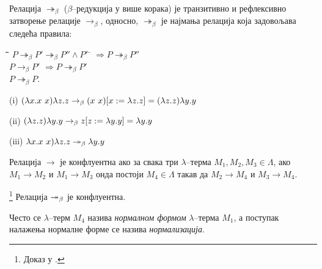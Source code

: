 \begin{definition}
Релација $\twoheadrightarrow_{\beta}$ ($\beta$--редукција у више
корака) је транзитивно и рефлексивно затворење релације
$\rightarrow_{\beta}$, односно, $\twoheadrightarrow_{\beta}$ је
најмања релација која задовољава следећа правила:
\begin{center}
\begin{tabbing}
\hspace{5mm}\=\hspace{5mm}\=\hspace{5mm}\=\hspace{5mm}\=\hspace{5mm}\=\kill
\>\> $P \twoheadrightarrow_{\beta} P' \twoheadrightarrow_{\beta} P'' \land P'$ \= $\Rightarrow P \twoheadrightarrow_{\beta} P''$ \\
\>\> $P \rightarrow_{\beta} P'$ \> $\Rightarrow P \twoheadrightarrow_{\beta} P'$ \\
\>\> $P \twoheadrightarrow_{\beta} P$.
\end{tabbing}
\end{center}
\end{definition}

\begin{primer}
\begin{description}
\item{(i)} $ (\lambda x. x\ x) \lambda z. z \rightarrow_{\beta} (x\ x)[x := \lambda z. z] = (\lambda z. z) \lambda y. y$
\item{(ii)} $(\lambda z. z)\lambda y. y \rightarrow_{\beta} z [z := \lambda y. y] = \lambda y. y$
\item{(iii)} $\lambda x. x\ x) \lambda z. z \twoheadrightarrow_{\beta} \lambda y. y$
\end{description}
\end{primer}

\begin{definition}[конфлуентност] 
Релација $\to$ је конфлуентна ако за свака три $\lambda$--терма $M_1,
M_2, M_3 \in \Lambda$, ако $M_1 \to M_2$ и $M_1 \to M_3$ онда постоји
$M_4 \in \Lambda$ такав да $M_2 \to M_4$ и $M_3 \to M_4$.
\end{definition}

\begin{theorem}[конфлуентност]\footnote{Доказ у \cite{barendregt2013lambda}.}  
Релација $\twoheadrightarrow_{\beta}$ је конфлуентна.
\end{theorem}


Често се $\lambda$--терм $M_4$ назива \emph{нормалном формом}
$\lambda$--терма $M_1$, а поступак налажења нормалне форме се назива
\emph{нормализација}.

